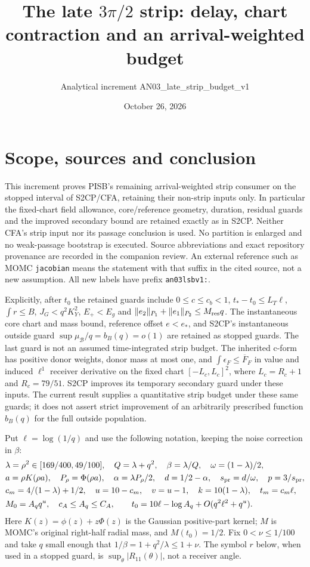 \documentclass[11pt]{article}
\title{The late $3\pi/2$ strip: delay, chart contraction and an arrival-weighted budget}
\author{Analytical increment AN03\_late\_strip\_budget\_v1}
\date{October 26, 2026}
\theoremstyle{remark}\newtheorem{remark}[theorem]{Remark}
\begin{document}
\maketitle

\section{Scope, sources and conclusion}
This increment proves PISB's remaining arrival-weighted strip consumer on
the stopped interval of S2CP/CFA, retaining their non-strip inputs only.
In particular the fixed-chart field allowance, core/reference geometry,
duration, residual guards and the improved secondary bound are retained
exactly as in S2CP. Neither CFA's strip input nor its passage conclusion is
used. No partition is enlarged and no weak-passage bootstrap is executed.
Source abbreviations and exact repository provenance are recorded in the
companion review. An external reference such as MOMC \texttt{jacobian}
means the statement with that suffix in the cited source, not a new
assumption. All new labels have prefix \texttt{an03lsbv1:}.

Explicitly, after $t_0$ the retained guards include
$0\le c\le c_b<1$, $t_*-t_0\le L_T\ell$, $\int r\le B$,
$J_G<q^2K_Y^2$, $E_+<E_g$ and
$\|e_2\|_{P_1}+\|e_1\|_{P_2}\le M_{\rm res}q$.
The instantaneous core chart and mass bound, reference offset $e<e_*$,
and S2CP's instantaneous outside guard
$\sup\mu_{\mathcal B}/q=b_B(q)=o(1)$ are retained as stopped guards.
The last guard is not an assumed time-integrated strip budget.
The inherited c-form has positive donor weights, donor mass at most
one, and $\int\epsilon_F\le\overline F_F$ in value and induced
$\ell^1$ receiver derivative on the fixed chart
$[-L_c,L_c]^2$, where $L_c=R_c+1$ and $R_c=79/51$.
S2CP improves its temporary secondary guard under these inputs.
The current result supplies a quantitative strip budget under these
same guards; it does not assert strict improvement of an arbitrarily
prescribed function $b_B(q)$ for the full outside population.

Put $\ell=\log(1/q)$ and use the following notation, keeping the noise
correction in $\beta$:
\begin{align}
 &\lambda=\rho^2\in[169/400,49/100],\quad Q=\lambda+q^2,
 \quad\beta=\lambda/Q,\quad \omega=(1-\lambda)/2,\nonumber\\
 &a=\rho K(\rho a),\quad P_\rho=\Phi(\rho a),\quad
 \alpha=\lambda P_\rho/2,\quad d=1/2-\alpha,
 \quad s_{\rm pr}=d/\omega,\quad p=3/s_{\rm pr},\nonumber\\
 &c_m=4/(1-\lambda)+1/2,\quad u=10-c_m,\quad v=u-1,
 \quad k=10(1-\lambda),\quad t_m=c_m\ell,\nonumber\\
 &M_0=A_q q^u,\quad c_A\le A_q\le C_A,\qquad
 t_0=10\ell-\log A_q+O(q^2\ell^2+q^u).
 \label{an03lsbv1:parameters}
\end{align}
Here $K(z)=\phi(z)+z\Phi(z)$ is the Gaussian positive-part kernel;
$M$ is MOMC's original right-half radial mass, and $M(t_0)=1/2$.
Fix $0<\nu\le1/100$ and take $q$ small enough that
$1/\beta=1+q^2/\lambda\le1+\nu$. The symbol $r$ below, when used in
a stopped guard, is $\sup_\theta|R_{11}(\theta)|$, not a receiver angle.
\end{document}
